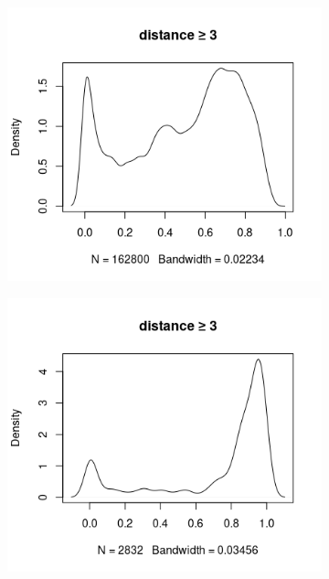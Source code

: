\documentclass{l4proj}
\theoremstyle{definition}
\theoremstyle{remark}
\begin{document}
\begin{figure}
  \begin{subfigure}[t]{0.49\textwidth}
    \centering
    \includegraphics[width=\textwidth]{images/mcs_prop3.png}
  \end{subfigure}
  \begin{subfigure}[t]{0.49\textwidth}
    \centering
    \includegraphics[width=\textwidth]{images/sip_prop3.png}
  \end{subfigure}
  \begin{subfigure}[t]{0.49\textwidth}

\end{subfigure}
\end{figure}
\end{document}
